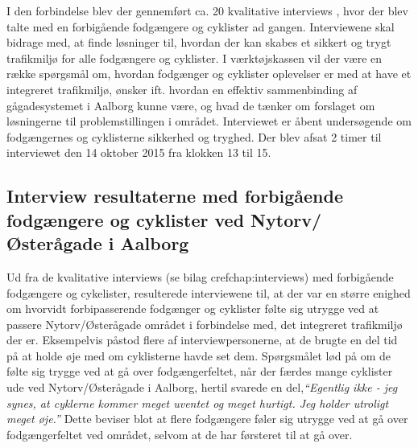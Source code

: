 I den forbindelse blev der gennemført ca. 20 kvalitative interviews , hvor der blev talte med en forbigående fodgængere og cyklister ad gangen. Interviewene skal bidrage med, at finde løsninger til, hvordan der kan skabes et sikkert og trygt trafikmiljø for alle fodgængere og cyklister.
I værktøjskassen vil der være en række spørgsmål om, hvordan fodgænger og cyklister oplevelser er med at have et integreret trafikmiljø, ønsker ift. hvordan en effektiv sammenbinding af gågadesystemet i Aalborg kunne være, og hvad de tænker om forslaget om løsningerne til problemstillingen i området.
Interviewet er åbent undersøgende om fodgængernes og cyklisterne sikkerhed og tryghed. Der blev afsat 2 timer til interviewet den 14 oktober 2015 fra klokken 13 til 15.%

\subsection{Interview resultaterne med forbigående fodgængere og cyklister ved Nytorv/Østerågade i Aalborg}
 Ud fra de kvalitative interviews (se bilag  cref{chap:interviews}) med forbigående fodgængere og cykelister, resulterede interviewene til, at der var en større enighed om hvorvidt forbipasserende fodgænger og cyklister følte sig utrygge ved at passere Nytorv/Østerågade området i forbindelse med, det integreret trafikmiljø der er. Eksempelvis påstod flere af interviewpersonerne, at de brugte en del tid på at holde øje med om cyklisterne havde set dem. Spørgsmålet lød på om de følte sig trygge ved at gå over fodgængerfeltet, når der færdes mange cyklister ude ved Nytorv/Østerågade i Aalborg, hertil svarede en del,\emph{“Egentlig ikke - jeg synes, at cyklerne kommer meget uventet og meget hurtigt. Jeg holder utroligt meget øje.”} Dette beviser blot at flere fodgængere føler sig utrygge ved at gå over fodgængerfeltet ved området, selvom at de har førsteret til at gå over.
\\

